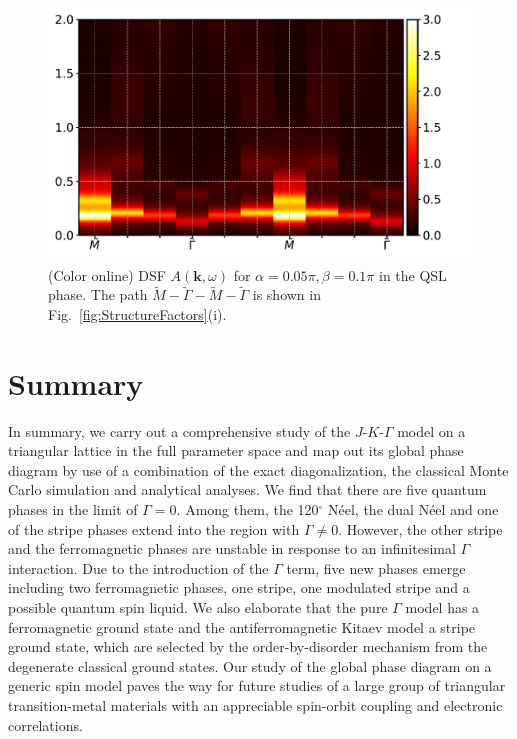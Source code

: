 \documentclass[aps,prb,reprint,amsfonts,amsmath,amssymb,showpacs,groupedaddress,superscriptaddress]{revtex4-1}
\begin{document}
\begin{figure}
    \centering
    \includegraphics[width=\columnwidth]{fig/Spectrum.pdf}
    \caption{\label{fig:Spectrum}(Color online) DSF $A(\bm{k}, \omega)$ for $\alpha=0.05\pi,\beta=0.1\pi$ in the QSL phase. The path $\tilde{M}-\tilde{\Gamma}-\tilde{M}-\tilde{\Gamma}$ is shown in Fig.~\ref{fig:StructureFactors}(i).}
\end{figure}


\section{\label{sec:Summary}Summary}

In summary, we carry out a comprehensive study of the $J$-$K$-$\Gamma$ model on a triangular lattice in the full parameter space and map out its global phase diagram by use of a combination of the exact diagonalization, the classical Monte Carlo simulation and analytical analyses. We find that there are five quantum phases in the limit of $\Gamma=0$.
Among them, the 120$^\circ$ N\'{e}el, the dual N\'{e}el and one of the stripe phases extend into the region with $\Gamma\ne 0$. However, the other stripe and the ferromagnetic phases are unstable in response to an infinitesimal $\Gamma$ interaction. Due to the introduction of the $\Gamma$ term, five new phases emerge including two ferromagnetic phases, one stripe, one modulated stripe and a possible quantum spin liquid. We also elaborate that the pure $\Gamma$ model has a ferromagnetic ground state and the antiferromagnetic Kitaev model a stripe ground state, which are selected by the order-by-disorder mechanism from the degenerate classical ground states.
Our study of the global phase diagram on a generic spin model paves the way for future studies of a large group of triangular transition-metal materials with an appreciable spin-orbit coupling and electronic correlations.
\end{document}
